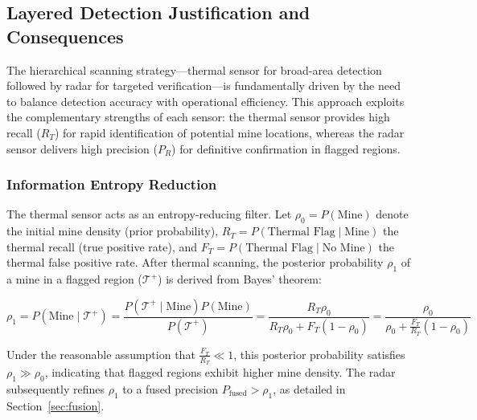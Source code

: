     \subsection{Layered Detection Justification and Consequences} 
    \label{sec:layered_approach}
    
        The hierarchical scanning strategy---thermal sensor for broad-area detection followed by radar for targeted verification---is fundamentally driven by the need to balance detection accuracy with operational efficiency. This approach exploits the complementary strengths of each sensor: the thermal sensor provides high recall (\(R_T\)) for rapid identification of potential mine locations, whereas the radar sensor delivers high precision (\(P_R\)) for definitive confirmation in flagged regions.
    
    \subsubsection{Information Entropy Reduction} 
    
        The thermal sensor acts as an entropy-reducing filter. Let \(\rho_0 = P(\text{Mine})\) denote the initial mine density (prior probability), \(R_T = P(\text{Thermal Flag} \mid \text{Mine})\) the thermal recall (true positive rate), and \(F_T = P(\text{Thermal Flag} \mid \text{No Mine})\) the thermal false positive rate. After thermal scanning, the posterior probability \(\rho_1\) of a mine in a flagged region (\(\mathcal{T}^+\)) is derived from Bayes' theorem:
        
        \begin{equation}
            \rho_1 = P(\text{Mine} \mid \mathcal{T}^+) = \frac{P(\mathcal{T}^+ \mid \text{Mine}) P(\text{Mine})}{P(\mathcal{T}^+)} = \frac{R_T \rho_0}{R_T \rho_0 + F_T (1 - \rho_0)} = \frac{\rho_0}{\rho_0 + \frac{F_T}{R_T} (1 - \rho_0)}
        \end{equation}
        
        Under the reasonable assumption that \(\frac{F_T}{R_T}\ll 1\), this posterior probability satisfies \(\rho_1 \gg \rho_0\), indicating that flagged regions exhibit higher mine density. The radar subsequently refines \(\rho_1\) to a fused precision \(P_{\text{fused}} > \rho_1\), as detailed in Section~\ref{sec:fusion}.
    
    
